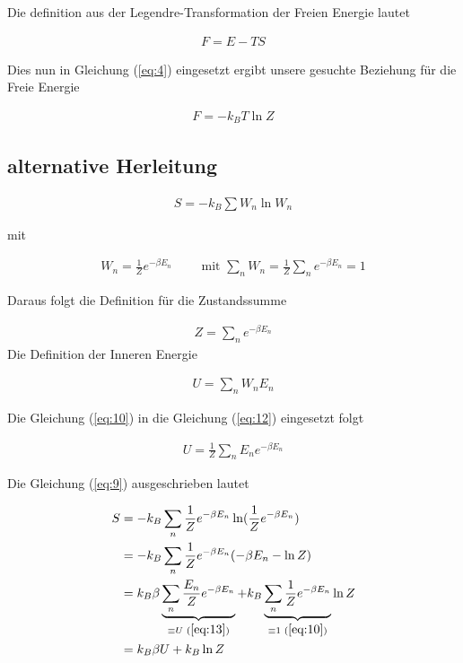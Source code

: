 Die definition aus der Legendre-Transformation der Freien Energie lautet

\begin{align}
  \label{eq:5}
  F = E - TS
\end{align}

Dies nun in Gleichung (\ref{eq:4}) eingesetzt ergibt unsere gesuchte Beziehung für die Freie Energie

\begin{align}
  \label{eq:6}
\boxed{  F =  - k_B T \ln Z }
\end{align}


\subsection*{alternative Herleitung}



\begin{align}
  \label{eq:9}
  S = - k_B\sum W_n \ln W_n
\end{align}

mit

\begin{align}
  \label{eq:10}
  W_n = \frac{1}{Z}e^{-\beta E_n}\qquad \text{ mit } \sum_n W_n = \frac{1}{Z}\sum_ne^{-\beta E_n} = 1
\end{align}

Daraus folgt die Definition für die Zustandssumme

\begin{align}
  \label{eq:11}
  Z = \sum_n e^{-\beta E_n}
\end{align}
Die Definition der Inneren Energie

\begin{align}
  \label{eq:12}
  U = \sum_n W_n E_n
\end{align}

Die Gleichung (\ref{eq:10}) in die Gleichung (\ref{eq:12}) eingesetzt folgt

\begin{align}
  \label{eq:13}
  U = \frac{1}{Z}\sum_n E_ne^{-\beta E_n}
\end{align}

Die Gleichung (\ref{eq:9}) ausgeschrieben lautet

\begin{align}
  \label{eq:15}
  S &= -k_B \sum_n \frac{1}{Z}e^{-\beta E_n} \ln(\frac{1}{Z}e^{-\beta E_n}) \notag\\
&= -k_B \sum_n \frac{1}{Z}e^{-\beta E_n} (-\beta E_n - \ln Z ) \notag\\
&= k_B \beta \underbr{\sum_n \frac{E_n}{Z}e^{-\beta E_n}}_{\equiv U\,\, (\ref{eq:13})} + k_B \underbr{\sum_n \frac{1}{Z}e^{-\beta E_n}}_{\equiv 1\,\, (\ref{eq:10})} \ln Z  \notag\\
&= k_B \beta U + k_B \ln Z
\end{align}

